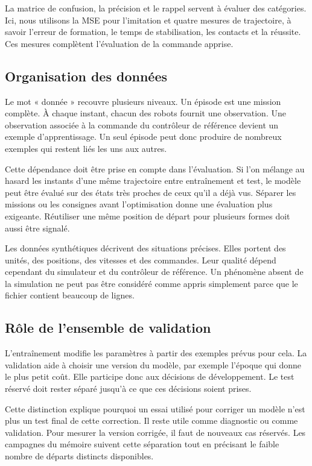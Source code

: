La matrice de confusion, la précision et le rappel servent à évaluer des catégories. Ici, nous utilisons la MSE pour l'imitation et quatre mesures de trajectoire, à savoir l'erreur de formation, le temps de stabilisation, les contacts et la réussite. Ces mesures complètent l'évaluation de la commande apprise.


\subsection{Organisation des données}
Le mot « donnée » recouvre plusieurs niveaux. Un épisode est une mission complète. À chaque instant, chacun des robots fournit une observation. Une observation associée à la commande du contrôleur de référence devient un exemple d'apprentissage. Un seul épisode peut donc produire de nombreux exemples qui restent liés les uns aux autres.

Cette dépendance doit être prise en compte dans l’évaluation. Si l'on mélange au hasard les instants d'une même trajectoire entre entraînement et test, le modèle peut être évalué sur des états très proches de ceux qu'il a déjà vus. Séparer les missions ou les consignes avant l'optimisation donne une évaluation plus exigeante. Réutiliser une même position de départ pour plusieurs formes doit aussi être signalé.

Les données synthétiques décrivent des situations précises. Elles portent des unités, des positions, des vitesses et des commandes. Leur qualité dépend cependant du simulateur et du contrôleur de référence. Un phénomène absent de la simulation ne peut pas être considéré comme appris simplement parce que le fichier contient beaucoup de lignes.

\subsection{Rôle de l'ensemble de validation}
L'entraînement modifie les paramètres à partir des exemples prévus pour cela. La validation aide à choisir une version du modèle, par exemple l'époque qui donne le plus petit coût. Elle participe donc aux décisions de développement. Le test réservé doit rester séparé jusqu'à ce que ces décisions soient prises.

Cette distinction explique pourquoi un essai utilisé pour corriger un modèle n'est plus un test final de cette correction. Il reste utile comme diagnostic ou comme validation. Pour mesurer la version corrigée, il faut de nouveaux cas réservés. Les campagnes du mémoire suivent cette séparation tout en précisant le faible nombre de départs distincts disponibles.

